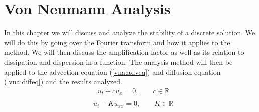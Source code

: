 \chapter{Von Neumann Analysis}
In this chapter we will discuss and analyze the stability of a discrete solution. We will do this by going over the Fourier transform and how it applies to the method. We will then discuss the amplification factor as well as its relation to dissipation and dispersion in a function. The analysis method will then be applied to the advection equation (\ref{vna:adveq}) and diffusion equation (\ref{vna:diffeq}) and the results analyzed.
\begin{equation} \label{vna:adveq}
\begin{aligned}
  &u_t + cu_x = 0, \qquad c \in \mathbb{R} \\
\end{aligned}
\end{equation}
\begin{equation} \label{vna:diffeq}
\begin{aligned}
  &u_{t} - Ku_{xx} = 0, \qquad K \in \mathbb{R} \\
\end{aligned}
\end{equation}
